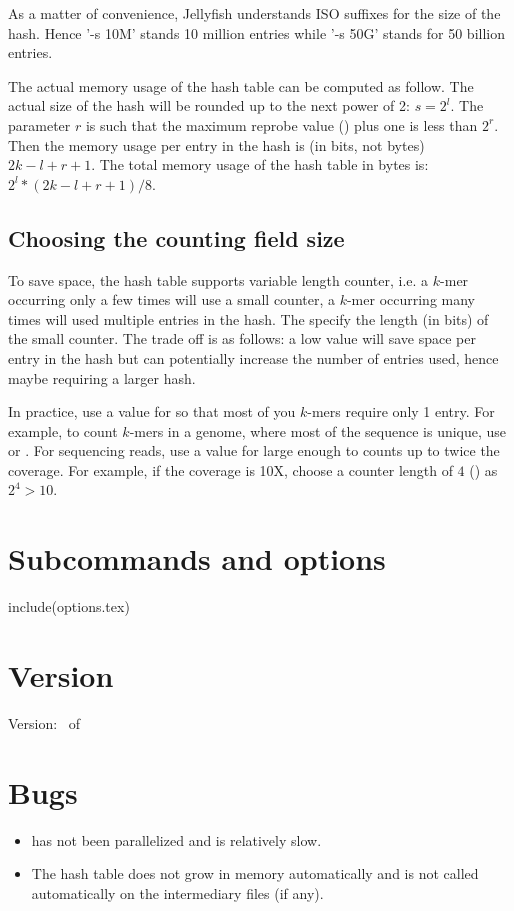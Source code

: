 \documentclass[english]{article}
\begin{document}
As a matter of convenience, Jellyfish understands ISO suffixes for the
size of the hash. Hence '-s 10M' stands 10 million entries while '-s
50G' stands for 50 billion entries.

The actual memory usage of the hash table can be computed as
follow. The actual size of the hash will be rounded up to the next
power of 2: $s=2^l$. The parameter $r$ is such that the maximum
reprobe value () plus one is less than $2^r$. Then the memory usage per
entry in the hash is (in bits, not bytes) $2k-l+r+1$. The total memory
usage of the hash table in bytes is: $2^l*(2k-l+r+1)/8$.

\subsection{Choosing the counting field size}
To save space, the hash table supports variable length counter, i.e. a
$k$-mer occurring only a few times will use a small counter, a $k$-mer
occurring many times will used multiple entries in the hash. The
 specify the length (in bits) of the small counter. The trade off is as
follows: a low value will save space per entry in the hash but can
potentially increase the number of entries used, hence maybe requiring
a larger hash.

In practice, use a value for  so that most of you $k$-mers
require only 1 entry. For example, to count $k$-mers in a genome,
where most of the sequence is unique, use  or
. For sequencing reads, use a value for  large
enough to counts up to twice the coverage. For example, if the
coverage is 10X, choose a counter length of $4$ () as $2^4 > 10$.



\section{Subcommands and options}
include(options.tex)

\section{Version}

Version: \Version\ of \Date

\section{Bugs}

\begin{itemize}
\item {} has not been parallelized and is
  relatively slow.
\item The hash table does not grow in memory automatically and
   is not called automatically on the
  intermediary files (if any).
\end{itemize}
\end{document}
